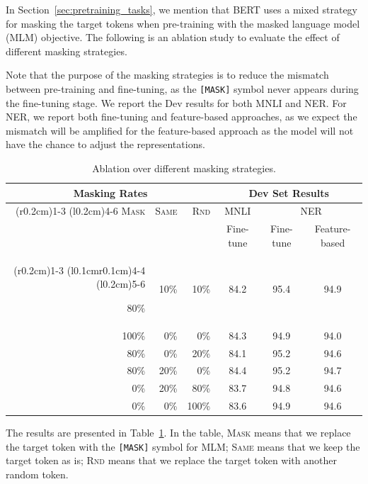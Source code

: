 \documentclass[11pt,a4paper]{article}
\begin{document}
In Section~\ref{sec:pretraining_tasks}, we mention that BERT uses a mixed strategy for masking the target tokens when pre-training with the masked language
model (MLM) objective. The following is an ablation study to evaluate the effect of different masking strategies.

Note that the purpose of the masking strategies is to reduce the mismatch
between pre-training and fine-tuning, as the {\tt [MASK]} symbol never appears during the fine-tuning stage. We report the Dev results for both
MNLI and NER. For NER, we report both fine-tuning and feature-based approaches,
as we expect the mismatch will be amplified for the feature-based approach as
the model will not have the chance to adjust the representations.

\begin{table}[ht]
\begin{center}
{\small
\begin{tabular}{@{}rrrccc@{}}
  \toprule
  \multicolumn{3}{c}{Masking Rates} & \multicolumn{3}{c}{Dev Set Results} \\
  \cmidrule(r{0.2cm}){1-3}
  \cmidrule(l{0.2cm}){4-6}
  \textsc{Mask} &	\textsc{Same}&	\textsc{Rnd}	& {MNLI} &	\multicolumn{2}{c}{NER}\\
   &  & & {\footnotesize Fine-tune} &   {\footnotesize Fine-tune}	& {\footnotesize Feature-based}\\
    \cmidrule(r{0.2cm}){1-3}
  \cmidrule(l{0.1cm}r{0.1cm}){4-4}
  \cmidrule(l{0.2cm}){5-6}
  
  80\%	&10\%	&10\%	&84.2	&95.4	&94.9\\
100\%	&0\%	&0\%	&84.3	&94.9	&94.0\\
80\%	&0\%	&20\%	&84.1	&95.2	&94.6\\
80\%	&20\%	&0\%	&84.4	&95.2	&94.7\\
0\%	&20\%	&80\%	&83.7	&94.8	&94.6 \\
0\%	&0\%	&100\%	&83.6	&94.9	&94.6\\
\bottomrule
\end{tabular}
} 
\end{center}
\caption{\label{tab:mask_ablation} Ablation over different masking strategies.}
\end{table}

The results are presented in Table~\ref{tab:mask_ablation}. In the table,
 \textsc{Mask} means that we replace the target token with the {\tt [MASK]} symbol
for MLM; \textsc{Same} means that we keep the target token as is; \textsc{Rnd}
means that we replace the target token with another random token. 
\end{document}
